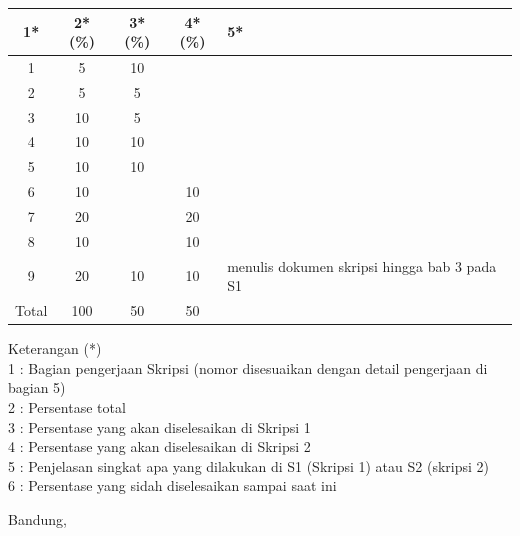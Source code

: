 \documentclass[a4paper,twoside]{article}
\begin{document}
\begin{center}
  \begin{tabular}{ | c | c | c | c | l |}
    \hline
    1*  & 2*(\%) & 3*(\%) & 4*(\%) &5*\\ \hline \hline
    1   & 5  & 10  &  &  \\ \hline
    2   & 5 & 5  &   & \\ \hline
    3   & 10  & 5  &  & \\ \hline
    4   & 10  & 10  &  & \\ \hline
    5   & 10  & 10  &  & \\ \hline
    6   & 10 &   & 10  & \\ \hline
    7   & 20  &   & 20 & \\ \hline
    8   & 10  &   &  10  & \\ \hline
    9   & 20  & 10  & 10  & {\footnotesize menulis dokumen skripsi hingga bab 3 pada S1}\\ \hline
    Total  & 100  & 50  & 50 &  \\ \hline
                          \end{tabular}
\end{center}

Keterangan (*)\\
1 : Bagian pengerjaan Skripsi (nomor disesuaikan dengan detail pengerjaan di bagian 5)\\
2 : Persentase total \\
3 : Persentase yang akan diselesaikan di Skripsi 1 \\
4 : Persentase yang akan diselesaikan di Skripsi 2 \\
5 : Penjelasan singkat apa yang dilakukan di S1 (Skripsi 1) atau S2 (skripsi 2)\\
6 : Persentase yang sidah diselesaikan sampai saat ini 

\vspace{1cm}
\centering Bandung, \tanggal\\
\vspace{2cm} \nama \\ 
\vspace{1cm}
\end{document}

